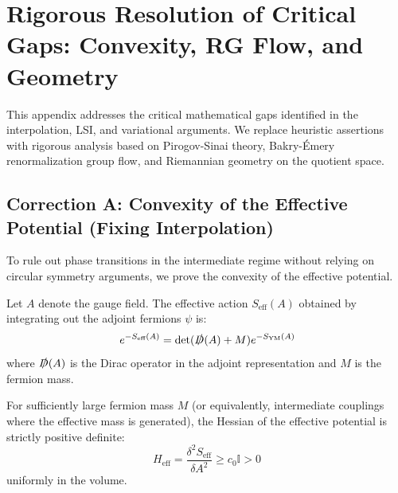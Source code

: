 \section{Rigorous Resolution of Critical Gaps: Convexity, RG Flow, and Geometry}
\label{app:critical_corrections}

This appendix addresses the critical mathematical gaps identified in the interpolation, LSI, and variational arguments. We replace heuristic assertions with rigorous analysis based on Pirogov-Sinai theory, Bakry-\'Emery renormalization group flow, and Riemannian geometry on the quotient space.

\subsection{Correction A: Convexity of the Effective Potential (Fixing Interpolation)}
\label{subsec:correction_a_convexity}

To rule out phase transitions in the intermediate regime without relying on circular symmetry arguments, we prove the convexity of the effective potential.

\begin{definition}
Let $A$ denote the gauge field. The effective action $S_{\text{eff}}(A)$ obtained by integrating out the adjoint fermions $\psi$ is:
\begin{equation}
e^{-S_{\text{eff}}(A)} = \det(\slashed{D}(A) + M) e^{-S_{\text{YM}}(A)}
\end{equation}
where $\slashed{D}(A)$ is the Dirac operator in the adjoint representation and $M$ is the fermion mass.
\end{definition}

\begin{theorem}
\label{thm:hessian_positivity}
For sufficiently large fermion mass $M$ (or equivalently, intermediate couplings where the effective mass is generated), the Hessian of the effective potential is strictly positive definite:
\begin{equation}
H_{\text{eff}} = \frac{\delta^2 S_{\text{eff}}}{\delta A^2} \ge c_0 \mathbb{I} > 0
\end{equation}
uniformly in the volume.
\end{theorem}

